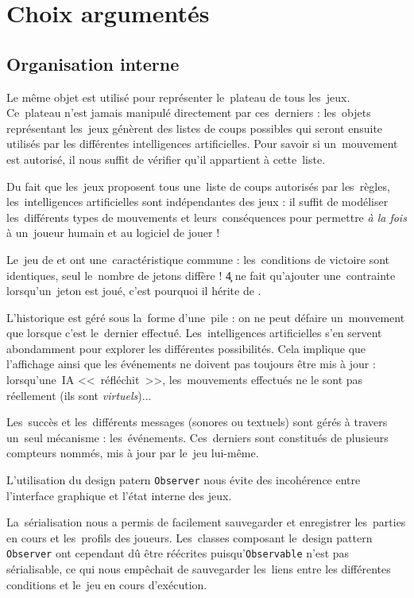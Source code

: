 \section{Choix argumentés}

\subsection{Organisation interne}
Le même objet est utilisé pour représenter le~plateau de tous les~jeux. Ce~plateau n'est jamais manipulé directement par ces~derniers :
les~objets représentant les~jeux génèrent des listes de coups possibles qui seront ensuite utilisés par les différentes intelligences artificielles.
Pour savoir si un~mouvement est autorisé, il nous suffit de vérifier qu'il appartient à cette~liste. 

Du fait que les~jeux proposent tous une~liste de coups autorisés par les~règles, les~intelligences artificielles sont indépendantes des jeux :
il suffit de modéliser les~différents types de mouvements et leurs~conséquences pour permettre \emph{à la fois} à un~joueur humain et au logiciel de jouer !

Le~jeu de \ttt{} et \cf{} ont une~caractéristique commune : les~conditions de victoire sont identiques, seul le~nombre de jetons diffère !
\c4 ne fait qu'ajouter une~contrainte lorsqu'un~jeton est joué, c'est pourquoi il hérite de \ttt.

L'historique est géré sous la~forme d'une~pile : on ne peut défaire un~mouvement que lorsque c'est le~dernier effectué. 
Les~intelligences artificielles s'en servent abondamment pour explorer les différentes possibilités. 
Cela implique que l'affichage ainsi que les événements ne doivent pas toujours être mis à jour : 
lorsqu'une~IA <<~réfléchit~>>, les~mouvements effectués ne le sont pas réellement (ils sont \emph{virtuels})...

Les~succès et les~différents messages (sonores ou textuels) sont gérés à travers un~seul mécanisme : 
les~événements. Ces~derniers sont constitués de plusieurs compteurs nommés, mis à jour par le~jeu lui-même. 

L'utilisation du design patern \texttt{Observer} nous évite des incohérence entre l'interface graphique et l'état interne des jeux.

La~sérialisation nous a permis de facilement sauvegarder et enregistrer les~parties en cours et les~profils des joueurs. 
Les~classes composant le~design pattern \texttt{Observer} ont cependant dû être réécrites puisqu'\texttt{Observable} n'est pas sérialisable, 
ce qui nous empêchait de sauvegarder les~liens entre les différentes conditions et le~jeu en cours d'exécution.


